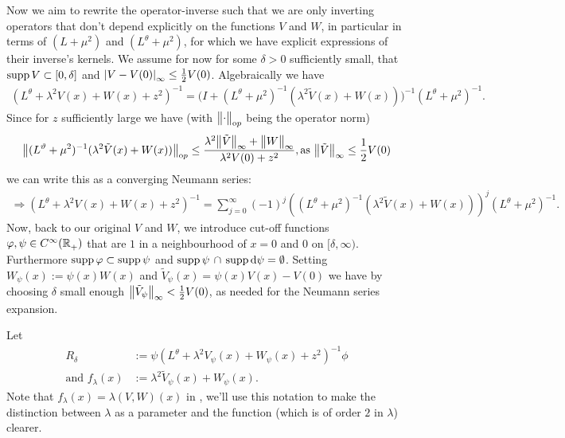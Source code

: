 Now we aim to rewrite the operator-inverse such that we are only inverting
operators that don't depend explicitly on the functions $V$ and $W$, in
particular in terms of $(L+\mu^2)$ and $(L^\theta+\mu^2)$, for which we have
explicit expressions of their inverse's kernels. We assume for now for some
$\delta > 0$ sufficiently small, that $\operatorname{supp} V \subset [0,\delta]$ and
$\left|V-V(0)\right|_{\infty}\leq \frac12V(0)$. Algebraically we have
\begin{align*}
  (L^\theta + \lambda^2 V(x) + W(x) + z^2)^{-1} =
    \bigl(I + (L^\theta + \mu^2)^{-1}(\lambda^2\tilde V(x) + W(x))\bigr)^{-1}
    (L^\theta + \mu^2)^{-1}.
\end{align*}
Since for $z$ sufficiently large we have (with $\bigl\|\cdot\bigr\|_{\mathrm op}$ being the
operator norm)
\begin{align*}
  \bigl\|(L^\vartheta + \mu^2)^{-1}(\lambda^2\tilde V(x) + W(x))\bigr\|_{\mathrm op} \leq
  \frac{\lambda^2\bigl\|\tilde V\bigr\|_{\infty} + \bigl\|W\bigr\|_{\infty}}{\lambda^2 V(0) + z^2},
  \text{as } \bigl\|\tilde V\bigr\|_{\infty} \leq \frac12V(0)
\end{align*}
we can write this as a converging Neumann series:
\begin{align}
  \label{frm:neumann-sum}
  \Rightarrow (L^\theta + \lambda^2 V(x) + W(x) + z^2)^{-1} =
    \sum_{j=0}^\infty (-1)^j \left((L^\theta + \mu^2)^{-1}(\lambda^2\tilde V(x)
    + W(x))\right)^j (L^\theta + \mu^2)^{-1}.
\end{align}
Now, back to our original $V$ and $W$, we introduce cut-off functions $\varphi,
\psi\in C^\infty_{}({\mathbb{R}_+^{}})$ that are $1$ in a neighbourhood of $x = 0$ and $0$ on
$[\delta,\infty)$. Furthermore $\operatorname{supp}\varphi\subset\operatorname{supp}\psi$ and
$\operatorname{supp}\psi\,\cap\,\operatorname{supp}\mathrm d\psi = \emptyset$. Setting $W_\psi(x) :=
\psi(x)W(x)$ and $\tilde V_\psi(x) = \psi(x)V(x) - V(0)$ we have by choosing
$\delta$ small enough $\bigl\|\tilde V_\psi\bigr\|_{\infty} < \frac12V(0)$, as needed for the
Neumann series expansion.

Let
\begin{align}
  \label{frm:r-delta}
  R_\delta &:= \psi(L^\theta + \lambda^2V_\psi(x) + W_\psi(x) + z^2)^{-1}\phi \\
  \label{frm:f-lambda}
  \text{and } f_\lambda(x) &:= \lambda^2\tilde V_\psi(x) + W_\psi(x).
\end{align}
Note that $f_\lambda(x) = \lambda(V,W)(x)$ in \cite{LV13}, we'll use this
notation to make the distinction between $\lambda$ as a parameter and the
function (which is of order $2$ in $\lambda$) clearer.

